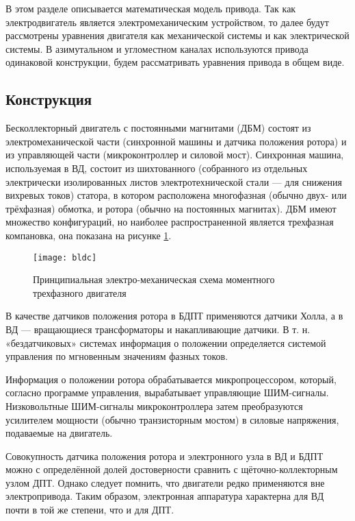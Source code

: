 В этом разделе описывается математическая модель привода. Так как электродвигатель является электромеханическим устройством, то далее будут рассмотрены уравнения двигателя как механической системы и как электрической системы. В азимутальном и угломестном каналах используются привода одинаковой конструкции, будем рассматривать уравнения привода в общем виде.

\subsection{Конструкция} \label{sec:ch3/sec9/sub1}

Бесколлекторный двигатель с постоянными магнитами (ДБМ) состоят из электромеханической части (синхронной машины и датчика положения ротора) и из управляющей части (микроконтроллер и силовой мост). Синхронная машина, используемая в ВД, состоит из шихтованного (собранного из отдельных электрически изолированных листов электротехнической стали — для снижения вихревых токов) статора, в котором расположена многофазная (обычно двух- или трёхфазная) обмотка, и ротора (обычно на постоянных магнитах). ДБМ имеют множество конфигураций, но наиболее распространенной является трехфазная компановка, она показана на рисунке \ref{fig:BLDC}.

\begin{figure}[ht]
	\centering
	\texttt{[image: bldc]} 
	\caption{Принципиальная электро-механическая схема моментного трехфазного двигателя \cite[]{BLDC}}
	\label{fig:BLDC}
\end{figure}

В качестве датчиков положения ротора в БДПТ применяются датчики Холла, а в ВД — вращающиеся трансформаторы и накапливающие датчики. В т. н. «бездатчиковых» системах информация о положении определяется системой управления по мгновенным значениям фазных токов.

Информация о положении ротора обрабатывается микропроцессором, который, согласно программе управления, вырабатывает управляющие ШИМ-сигналы. Низковольтные ШИМ-сигналы микроконтроллера затем преобразуются усилителем мощности (обычно транзисторным мостом) в силовые напряжения, подаваемые на двигатель.

Совокупность датчика положения ротора и электронного узла в ВД и БДПТ можно с определённой долей достоверности сравнить с щёточно-коллекторным узлом ДПТ. Однако следует помнить, что двигатели редко применяются вне электропривода. Таким образом, электронная аппаратура характерна для ВД почти в той же степени, что и для ДПТ. \cite[]{BLDC}



